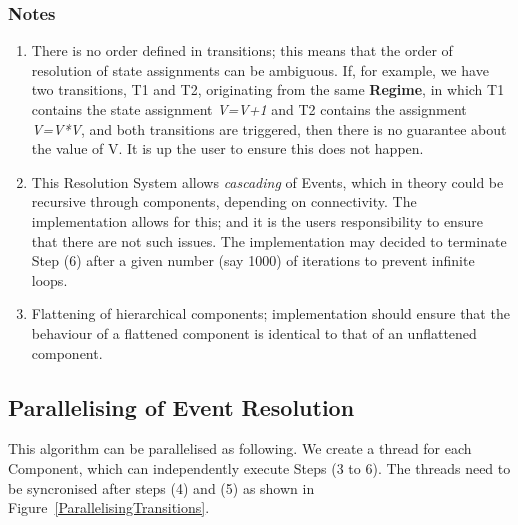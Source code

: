 \documentclass{article}
\newcommand{\Regime}{{\bf{Regime}}\xspace}
\begin{document}
\subsubsection{Notes}


\begin{enumerate}
\item  There is no order defined in transitions; this means
that the order of resolution of state assignments can be ambiguous. If, for
example, we have two transitions, T1 and T2, originating from the same \Regime,
in which T1 contains the state assignment \textsl{V=V+1} and T2 contains the
assignment \textsl{V=V*V}, and both transitions are triggered, then there is no
guarantee about the value of V. It is up the user to ensure this does not
happen.

\item This Resolution System allows \emph{cascading} of Events, which in theory
could be recursive through components, depending on connectivity. The
implementation allows for this; and it is the users responsibility to ensure
that there are not such issues. The implementation may decided to terminate
Step (6) after a given number (say 1000) of iterations to prevent infinite
loops.

\item Flattening of hierarchical components; implementation should ensure that
the behaviour of a flattened component is identical to that of an unflattened
component.
\end{enumerate}

\subsection{Parallelising of Event Resolution}

This algorithm can be parallelised as following. We create a thread for each
Component, which can independently execute Steps (3 to 6). The threads need
to be syncronised after steps (4) and (5) as shown in
Figure~\ref{ParallelisingTransitions}.
\end{document}
